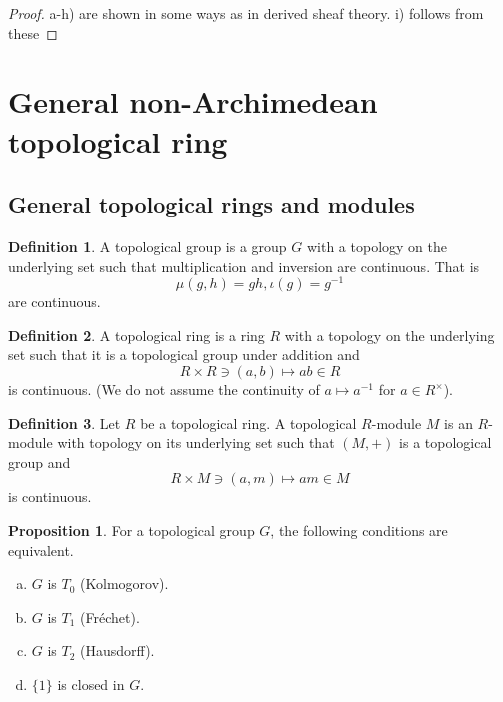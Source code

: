 \documentclass[10pt]{article}
\numberwithin{equation}{section}
\theoremstyle{definition}
\newtheorem{proposition}{Proposition}[subsection]
\newtheorem{definition}{Definition}[subsection]
\begin{document}
\begin{proof}
    a-h) are shown in some ways as in derived sheaf theory. i) follows from these
\end{proof}

\section{General non-Archimedean topological ring}
\subsection{General topological rings and modules}
\begin{definition}
    \label{definition_11_1_1}
    A topological group is a group $G$ with a topology on the underlying set such that multiplication and inversion are continuous. That is
    \begin{equation*}
        \mu(g,h)=gh,\iota(g) = g^{-1}
    \end{equation*}
    are continuous.
\end{definition}
\begin{definition}
    \label{definition_11_1_2}
    A topological ring is a ring $R$ with a topology on the underlying set such that it is a topological group under addition and
    \begin{equation*}
        R\times R\ni(a,b)\mapsto ab\in R
    \end{equation*}
    is continuous. (We do not assume the continuity of $a\mapsto a^{-1}$ for $a\in R^\times$).
\end{definition}
\begin{definition}
    \label{definition_11_1_3}
    Let $R$ be a topological ring. A topological $R$-module $M$ is an $R$-module with topology on its underlying set such that $(M,+)$ is a topological group and
    \begin{equation*}
        R\times M\ni (a,m)\mapsto am\in M
    \end{equation*}
    is continuous.
\end{definition}
\begin{proposition}
    \label{fact_11_1}
    For a topological group $G$, the following conditions are equivalent.
    \begin{enumerate}[a.]
        \item $G$ is $T_0$ (Kolmogorov).
        \item $G$ is $T_1$ (Fréchet).
        \item $G$ is $T_2$ (Hausdorff).
        \item $\{1\}$ is closed in $G$.
    \end{enumerate}
\end{proposition}
\end{document}
